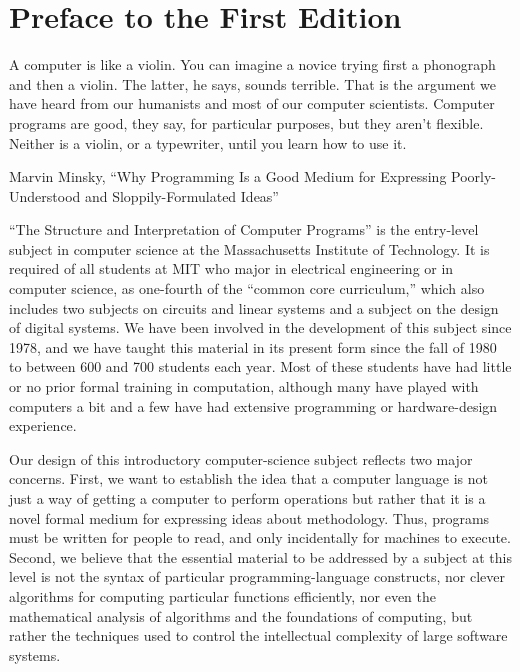 \chapter{Preface to the First Edition}
\epigraph{
  A computer is like a violin.  You can imagine a novice trying first a
phonograph and then a violin.  The latter, he says, sounds terrible.
That is the argument we have heard from our humanists and most of our
computer scientists.  Computer programs are good, they say, for
particular purposes, but they aren't flexible.  Neither is a violin,
or a typewriter, until you learn how to use it.}{Marvin Minsky, ``Why Programming Is a Good Medium for Expressing
Poorly-Understood and Sloppily-Formulated Ideas''}

``The Structure and Interpretation of Computer Programs'' is the
entry-level subject in computer science at the Massachusetts Institute
of Technology.  It is required of all students at MIT who major
in electrical engineering or in computer science, as one-fourth of the
``common core curriculum,'' which also includes two subjects on
circuits and linear systems and a subject on the design of digital
systems.  We have been involved in the development of this subject
since 1978, and we have taught this material in its present form since
the fall of 1980 to between 600 and 700 students each year.  Most of
these students have had little or no prior formal training in
computation, although many have played with computers a bit and a few
have had extensive programming or hardware-design experience.

Our design of this introductory computer-science subject reflects two
major concerns.  First, we want to establish the idea that a computer
language is not just a way of getting a computer to perform operations
but rather that it is a novel formal medium for expressing ideas about
methodology.  Thus, programs must be written for people to read, and
only incidentally for machines to execute.  Second, we believe that
the essential material to be addressed by a subject at this level is
not the syntax of particular programming-language constructs, nor
clever algorithms for computing particular functions efficiently, nor
even the mathematical analysis of algorithms and the foundations of
computing, but rather the techniques used to control the intellectual
complexity of large software systems.


